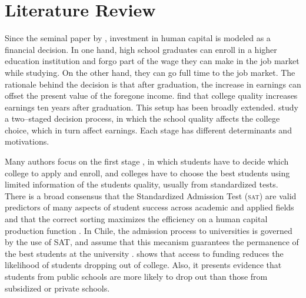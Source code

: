 \documentclass[5p,authoryear,preprint,12pt]{elsarticle}
\begin{document}
\section{Literature Review}


Since the seminal paper by \citet{becker1962}, investment in human capital is modeled as a financial decision. In one hand, high school graduates can enroll in a higher education institution and forgo part of the wage they can make in the job market while studying. On the other hand, they can go full time to the job market. The rationale behind the decision is that after graduation, the increase in earnings can offset the present value of the foregone income. \citet{dillon2017} find that college quality increases earnings ten years after graduation. This setup has been broadly extended. \citet{strayer2002} study a two--staged decision process, in which the school quality affects the college choice, which in turn affect earnings. Each stage has different determinants and motivations. 

Many authors focus on the first stage \citep[e.g,][]{zvoch2006freshman,venegas2019higher}, in which students have to decide which college to apply and enroll, and colleges have to choose the best students using limited information of the students quality, usually from standardized tests. There is a broad consensus that the Standardized Admission Test (\textsc{sat}) are valid predictors of many aspects of student success across academic and applied fields \citep{manski1983,camara2000sat,kuncel2007standardized} and that the correct sorting maximizes the efficiency on a human capital production function \citep{sallee2008}. In Chile, the admission process to universities is governed by the use of SAT, and assume that this mecanism guarantees the permanence of the best students at the university \citep{donoso2007analisis,servicio2014panorama}. \citet{rubio2011desercion} shows that access to funding reduces the likelihood of students dropping out of college. Also, it presents evidence that students from public schools are more likely to drop out than those from subsidized or private schools.
	
\end{document}
